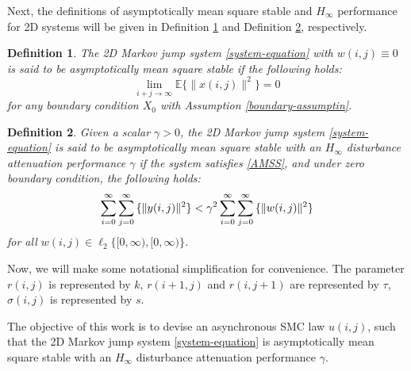 \documentclass[conference]{IEEEtran}
\newtheorem{definition}{Definition}
\begin{document}
	Next, the definitions of  asymptotically mean square stable and $H_{\infty}$ performance for 2D systems will be given in Definition \ref{mean-square-stable} and Definition \ref{H_infty-performance}, respectively.
	
	\begin{definition}\label{mean-square-stable}
	The 2D Markov jump system \eqref{system-equation} with $w(i,j)\equiv0$ is said to be asymptotically mean square stable if the following holds:
	\begin{equation}\label{AMSS}
			\lim\limits_{i+j\to\infty}\mathbb{E}\{\|x(i,j)\|^{2}\} = 0
	\end{equation}
	for any boundary condition $X_{0}$ with Assumption \ref{boundary-assumptin}.
	\end{definition}


	\begin{definition}\label{H_infty-performance}
		Given a scalar $\gamma>0$, the 2D Markov jump system \eqref{system-equation} is said to be asymptotically mean square stable with an $H_{\infty}$ disturbance attenuation performance $\gamma$ if the system satisfies \eqref{AMSS}, and under zero boundary condition, the following holds:
		\begin{equation} \label{invDef2}
			\sum_{i=0}^{\infty}\sum_{j=0}^{\infty}\mathbb\{\|y(i,j)\|^{2}\} <  \gamma^{2} \sum_{i=0}^{\infty}\sum_{j=0}^{\infty}\mathbb\{\|w(i,j)\|^{2}\}
		\end{equation}
		for all $w(i,j)\in\ell_{2}\{[0,\infty),[0,\infty)\}$.
	\end{definition}
	
	Now, we will make some notational simplification for convenience. The parameter $r(i,j)$ is represented by $k$, $r(i+1,j)$ and $r(i,j+1)$ are represented by $\tau$, $\sigma(i,j)$ is represented by $s$. 
	
	
	
	 The objective of this work is to devise an asynchronous  SMC law $u(i,j)$, such that the 2D Markov jump system \eqref{system-equation} is asymptotically mean square stable with an $H_{\infty}$ disturbance attenuation performance $\gamma$. 
\end{document}
